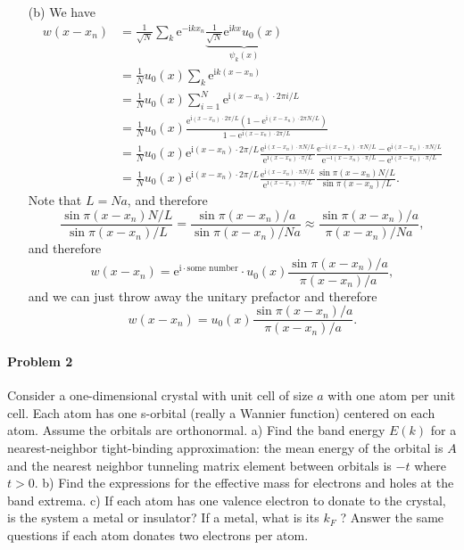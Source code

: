 \documentclass[hyperref, a4paper]{article}
\newcommand*{\ii}{\mathrm{i}}
\newcommand*{\ee}{\mathrm{e}}
\begin{document}
\begin{itemize}
\item[(b)] We have 
\[
    \begin{aligned}
        w(x - x_n) &= \frac{1}{\sqrt{N}} \sum_{k} 
        \ee^{- \ii k x_n} \underbrace{\frac{1}{\sqrt{N}} \ee^{\ii k x} u_0(x)}_{\psi_k(x)} \\
        &= \frac{1}{N} u_0(x) \sum_k \ee^{\ii k (x - x_n)} \\
        &= \frac{1}{N} u_0(x) \sum_{i=1}^N \ee^{\ii (x - x_n) \cdot 2\pi i / L} \\
        &= \frac{1}{N} u_0(x) \frac{
            \ee^{\ii (x - x_n) \cdot 2\pi / L} (1 - \ee^{\ii (x - x_n) \cdot 2\pi N / L})
        }{
            1 - \ee^{\ii (x - x_n) \cdot 2\pi / L}
        } \\
        &= \frac{1}{N} u_0(x) \ee^{\ii (x - x_n) \cdot 2\pi / L} 
        \frac{\ee^{\ii (x - x_n) \cdot \pi N / L}}{\ee^{\ii (x - x_n) \cdot \pi / L}}
        \frac{
            \ee^{- \ii (x - x_n) \cdot \pi N / L} - \ee^{\ii (x - x_n) \cdot \pi N / L}
        }{
           \ee^{- \ii (x - x_n) \cdot \pi / L} - \ee^{\ii (x - x_n) \cdot \pi / L}
        } \\
        &= \frac{1}{N} u_0(x) \ee^{\ii (x - x_n) \cdot 2\pi / L} 
        \frac{\ee^{\ii (x - x_n) \cdot \pi N / L}}{\ee^{\ii (x - x_n) \cdot \pi / L}}
        \frac{\sin \pi (x - x_n) N / L}{\sin \pi (x - x_n) / L}.
    \end{aligned}
\]
Note that $L = Na$, and therefore 
\[
    \frac{\sin \pi (x - x_n) N / L}{\sin \pi (x - x_n) / L}
    = \frac{\sin \pi (x - x_n) / a}{\sin \pi (x - x_n) / Na}
    \approx \frac{\sin \pi (x - x_n) / a}{\pi (x - x_n) / Na},
\]
and therefore 
\begin{equation}
    w(x - x_n) = \ee^{\ii \cdot \text{some number}} 
    \cdot u_0(x) \frac{\sin \pi (x - x_n) / a}{\pi (x - x_n) / a},
\end{equation}
and we can just throw away the unitary prefactor and therefore 
\begin{equation}
    w(x - x_n) = u_0(x) \frac{\sin \pi (x - x_n) / a}{\pi (x - x_n) / a}.
\end{equation}

\end{itemize}


\paragraph{Problem 2} Consider a one-dimensional crystal with unit cell of size $a$ with one atom per unit cell. Each atom has one s-orbital (really a Wannier function) centered on each atom. Assume the orbitals are orthonormal.
a) Find the band energy $E(k)$ for a nearest-neighbor tight-binding approximation: the mean energy of the orbital is $A$ and the nearest neighbor tunneling matrix element between orbitals is $-t$ where $t>0$.
b) Find the expressions for the effective mass for electrons and holes at the band extrema.
c) If each atom has one valence electron to donate to the crystal, is the system a metal or insulator? If a metal, what is its $k_F$ ? Answer the same questions if each atom donates two electrons per atom.
\end{document}
